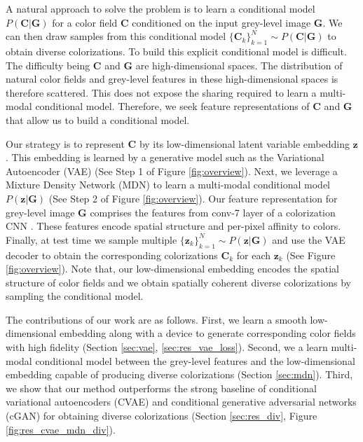 \documentclass[10pt,twocolumn,letterpaper]{article}
\begin{document}
A natural approach to solve the problem is to learn a conditional 
model $P(\mathbf{C}|\mathbf{G})$ for a color field $\mathbf{C}$ conditioned 
on the input grey-level image $\mathbf{G}$. We can then draw samples from 
this conditional model $\{\mathbf{C}_k\}_{k=1}^{N} \sim P(\mathbf{C}|\mathbf{G})$ 
to obtain diverse colorizations. To build this explicit conditional model 
is difficult. The difficulty being $\mathbf{C}$ and $\mathbf{G}$ are 
high-dimensional spaces. The distribution of natural color fields and 
grey-level features  in these high-dimensional spaces is therefore scattered. This does not
expose the sharing required to learn a multi-modal conditional model. Therefore, 
we seek feature representations of $\mathbf{C}$ and $\mathbf{G}$ that allow us to 
build a conditional model.

Our strategy is to represent $\mathbf{C}$ by its low-dimensional
latent variable embedding $\mathbf{z}$. This embedding is learned 
by a generative model such as the Variational Autoencoder (VAE) 
\cite{AEB} (See Step 1 of Figure \ref{fig:overview}). Next, we leverage 
a Mixture Density Network (MDN) to learn a multi-modal conditional 
model $P(\mathbf{z}|\mathbf{G})$ (See Step 2 of Figure \ref{fig:overview}). 
Our feature representation for grey-level image $\mathbf{G}$ comprises 
the features from conv-7 layer of a colorization CNN \cite{ZhangColorful}. 
These features encode spatial structure and per-pixel affinity to colors. Finally, 
at test time we sample multiple $\{ \mathbf{z}_{k} \}_{k=1}^{N} \sim P(\mathbf{z}|\mathbf{G})$ 
and use the VAE decoder to obtain the corresponding colorizations $\mathbf{C}_k$
for each $\mathbf{z}_k$ (See Figure \ref{fig:overview}). Note that, 
our low-dimensional embedding encodes the spatial structure of color fields 
and we obtain spatially coherent diverse colorizations by sampling the 
conditional model.

The contributions of our work are as follows. First, we learn 
a smooth low-dimensional embedding along with a device to 
generate corresponding color fields with high fidelity 
(Section \ref{sec:vae}, \ref{sec:res_vae_loss}). Second, we a learn multi-modal conditional 
model between the grey-level features and the low-dimensional 
embedding capable of producing diverse colorizations (Section \ref{sec:mdn}). Third, we show that our
method outperforms the strong baseline of conditional 
variational autoencoders (CVAE) and conditional generative adversarial 
networks (cGAN) \cite{Isola} for obtaining diverse colorizations 
(Section \ref{sec:res_div}, Figure \ref{fig:res_cvae_mdn_div}).
\end{document}
